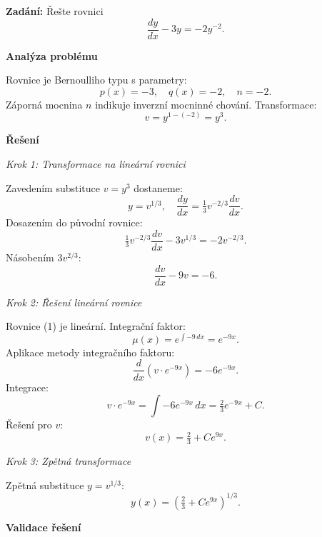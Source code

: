     \begin{example}
    \label{ex:a1-slozite-zaporna-n}
    
    \noindent\textbf{Zadání:} Řešte rovnici
    \[
    \frac{dy}{dx} - 3y = -2y^{-2}.
    \]
    
    \vspace{1.5\baselineskip}
    
    \noindent\textbf{Analýza problému}
    
    \noindent Rovnice je Bernoulliho typu s parametry:
    \[
    p(x) = -3, \quad q(x) = -2, \quad n = -2.
    \]
    Záporná mocnina $n$ indikuje inverzní mocninné chování. Transformace:
    \[
    v = y^{1-(-2)} = y^{3}.
    \]
    
    \vspace{1.5\baselineskip}
    
    \noindent\textbf{Řešení}
    
    \noindent\textit{Krok 1: Transformace na lineární rovnici}
    
    Zavedením substituce $v = y^{3}$ dostaneme:
    \[
    y = v^{1/3}, \quad \frac{dy}{dx} = \tfrac{1}{3}v^{-2/3}\frac{dv}{dx}.
    \]
    Dosazením do původní rovnice:
    \[
    \tfrac{1}{3}v^{-2/3}\frac{dv}{dx} - 3v^{1/3} = -2v^{-2/3}.
    \]
    Násobením $3v^{2/3}$:
    \[
    \frac{dv}{dx} - 9v = -6. \tag{1}
    \]
    
    \vspace{1\baselineskip}
    
    \noindent\textit{Krok 2: Řešení lineární rovnice}
    
    Rovnice (1) je lineární. Integrační faktor:
    \[
    \mu(x) = e^{\int -9\,dx} = e^{-9x}.
    \]
    Aplikace metody integračního faktoru:
    \[
    \frac{d}{dx}(v \cdot e^{-9x}) = -6e^{-9x}.
    \]
    Integrace:
    \[
    v \cdot e^{-9x} = \int -6e^{-9x}\,dx = \tfrac{2}{3}e^{-9x} + C.
    \]
    Řešení pro $v$:
    \[
    v(x) = \tfrac{2}{3} + Ce^{9x}. \tag{2}
    \]
    
    \vspace{1\baselineskip}
    
    \noindent\textit{Krok 3: Zpětná transformace}
    
    Zpětná substituce $y = v^{1/3}$:
    \[
    y(x) = \left(\tfrac{2}{3} + Ce^{9x}\right)^{1/3}. \tag{3}
    \]
    
    \vspace{1.5\baselineskip}
    
    \noindent\textbf{Validace řešení}
    

\end{example}
